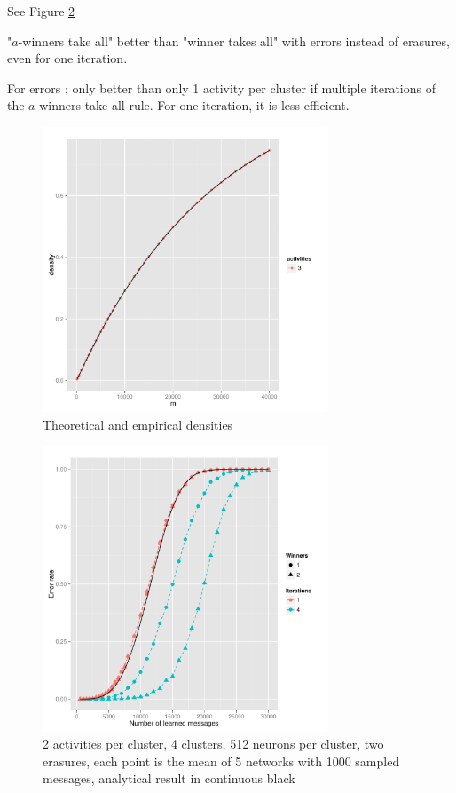 \documentclass[english,11pt,twocolumn]{article}
\theoremstyle{definition}
\begin{document}
	See Figure \ref{erasuresth}	
	
		"$a$-winners take all" better than "winner takes all" with errors instead of erasures, even for one iteration.
	
	For errors : only better than only 1 activity per cluster if multiple iterations of the $a$-winners take all rule.
	For one iteration, it is less efficient.
	\begin{figure}[!htb]
		\includegraphics[width=8.5cm]{Courbes/densiteexemple.pdf}
		\caption{Theoretical and empirical densities}
			\label{densiteth}
	\end{figure}
	
	\begin{figure}[!htb]
		\includegraphics[width=8.5cm]{Courbes/remplacement_figure2g1} %
		\caption{2 activities per cluster, 4 clusters, 512 neurons per cluster, two erasures, each point is the mean of 5 networks with 1000 sampled messages, analytical result in continuous black}
			\label{erasuresth}
		\end{figure}
		
\end{document}
